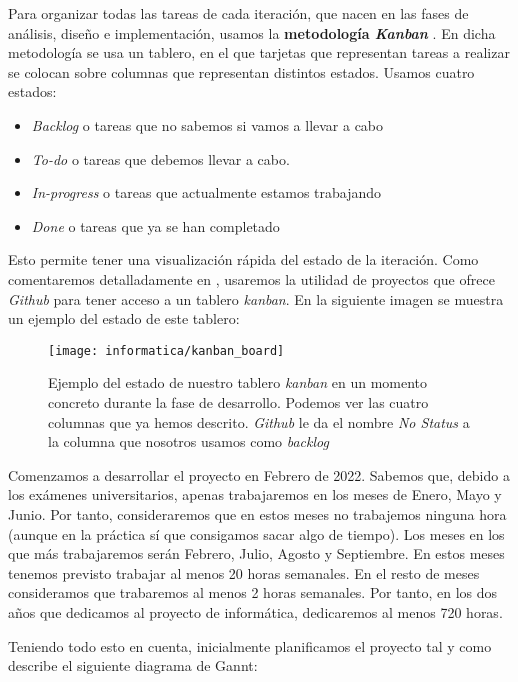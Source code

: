 Para organizar todas las tareas de cada iteración, que nacen en las fases de análisis, diseño e implementación, usamos la \textbf{metodología \textit{Kanban}} \cite{informatica:kanban_paper}. En dicha metodología se usa un tablero, en el que tarjetas que representan tareas a realizar se colocan sobre columnas que representan distintos estados. Usamos cuatro estados:

\begin{itemize}
    \item \textit{Backlog} o tareas que no sabemos si vamos a llevar a cabo
    \item \textit{To-do} o tareas que debemos llevar a cabo.
    \item \textit{In-progress} o tareas que actualmente estamos trabajando
    \item \textit{Done} o tareas que ya se han completado
\end{itemize}

Esto permite tener una visualización rápida del estado de la iteración. Como comentaremos detalladamente en , usaremos la utilidad de proyectos que ofrece \textit{Github} para tener acceso a un tablero \textit{kanban}. En la siguiente imagen se muestra un ejemplo del estado de este tablero:

\begin{figure}[H]
    \centering
    \texttt{[image: informatica/kanban\_board]}
    \caption{Ejemplo del estado de nuestro tablero \textit{kanban} en un momento concreto durante la fase de desarrollo. Podemos ver las cuatro columnas que ya hemos descrito. \textit{Github} le da el nombre \textit{No Status} a la columna que nosotros usamos como \textit{backlog}}
\end{figure}

Comenzamos a desarrollar el proyecto en Febrero de 2022. Sabemos que, debido a los exámenes universitarios, apenas trabajaremos en los meses de Enero, Mayo y Junio. Por tanto, consideraremos que en estos meses no trabajemos ninguna hora (aunque en la práctica sí que consigamos sacar algo de tiempo). Los meses en los que más trabajaremos serán Febrero, Julio, Agosto y Septiembre. En estos meses tenemos previsto trabajar al menos 20 horas semanales. En el resto de meses consideramos que trabaremos al menos 2 horas semanales. Por tanto, en los dos años que dedicamos al proyecto de informática, dedicaremos al menos 720 horas.

Teniendo todo esto en cuenta, inicialmente planificamos el proyecto tal y como describe el siguiente diagrama de Gannt:

